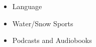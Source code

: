%
%
%

\twocolumnsection
{
\begin{skills}
\end{skills}}
{
\vspace{1em}
\begin{itemize}
	\item Language
	\item Water/Snow Sports                    
    \item Podcasts and Audiobooks
\end{itemize}
}
